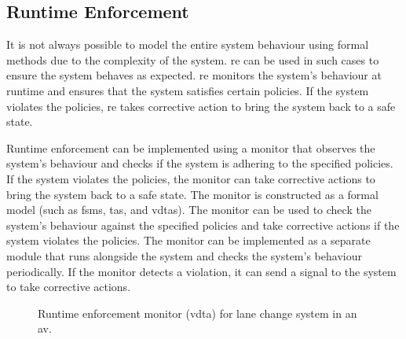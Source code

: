 \subsection{Runtime Enforcement}
It is not always possible to model the entire system behaviour using formal methods due to the complexity of the system. \gls{re} can be used in such cases to ensure the system behaves as expected. \gls{re} monitors the system's behaviour at runtime and ensures that the system satisfies certain policies. If the system violates the policies, \gls{re} takes corrective action to bring the system back to a safe state.

Runtime enforcement can be implemented using a monitor that observes the system's behaviour and checks if the system is adhering to the specified policies. If the system violates the policies, the monitor can take corrective actions to bring the system back to a safe state. The monitor is constructed as a formal model (such as \glspl{fsm}, \glspl{ta}, and \glspl{vdta}). The monitor can be used to check the system's behaviour against the specified policies and take corrective actions if the system violates the policies. The monitor can be implemented as a separate module that runs alongside the system and checks the system's behaviour periodically. If the monitor detects a violation, it can send a signal to the system to take corrective actions.


\begin{figure}[htbp] 
 \centering
 \caption{Runtime enforcement monitor (\gls{vdta}) for lane change system in an  \gls{av}.}
 \label{fig:re}
\end{figure}

